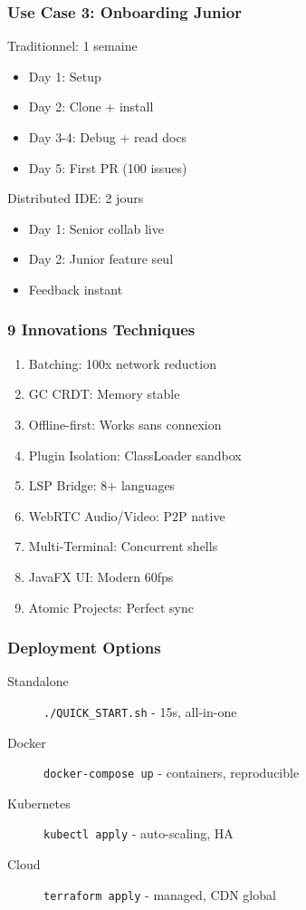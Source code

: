 \documentclass[aspectratio=16:9]{beamer}
\begin{document}
\begin{frame}
  \frametitle{Use Case 3: Onboarding Junior}
  
  Traditionnel: 1 semaine
  \begin{itemize}
    \item Day 1: Setup
    \item Day 2: Clone + install
    \item Day 3-4: Debug + read docs
    \item Day 5: First PR (100 issues)
  \end{itemize}
  
  \bigskip
  
  Distributed IDE: 2 jours
  \begin{itemize}
    \item Day 1: Senior collab live
    \item Day 2: Junior feature seul
    \item Feedback instant
  \end{itemize}
\end{frame}


\begin{frame}
  \frametitle{9 Innovations Techniques}
  
  \begin{enumerate}
    \item Batching: 100x network reduction
    \item GC CRDT: Memory stable
    \item Offline-first: Works sans connexion
    \item Plugin Isolation: ClassLoader sandbox
    \item LSP Bridge: 8+ languages
    \item WebRTC Audio/Video: P2P native
    \item Multi-Terminal: Concurrent shells
    \item JavaFX UI: Modern 60fps
    \item Atomic Projects: Perfect sync
  \end{enumerate}
\end{frame}

\begin{frame}
  \frametitle{Deployment Options}
  
  \begin{description}
    \item[Standalone] \texttt{./QUICK_START.sh} - 15s, all-in-one
    \item[Docker] \texttt{docker-compose up} - containers, reproducible
    \item[Kubernetes] \texttt{kubectl apply} - auto-scaling, HA
    \item[Cloud] \texttt{terraform apply} - managed, CDN global
  \end{description}
\end{frame}
\end{document}
